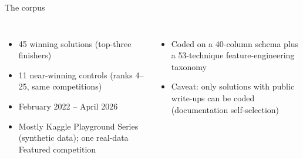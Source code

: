 \documentclass[aspectratio=169,11pt]{beamer}
\begin{document}
\begin{frame}{The corpus}
  \begin{columns}[T]
    \begin{itemize}
      \item \alert{45 winning solutions} (top-three finishers)
      \item \alert{11 near-winning controls} (ranks 4--25, same competitions)
      \item February 2022 -- April 2026
      \item Mostly Kaggle Playground Series (synthetic data); one real-data
            Featured competition
    \end{itemize}
    \begin{itemize}
      \item Coded on a \alert{40-column schema} plus a \alert{53-technique}
            feature-engineering taxonomy
      \item Caveat: only solutions with public write-ups can be coded
            (documentation self-selection)
    \end{itemize}
  \end{columns}
\end{frame}
\end{document}
